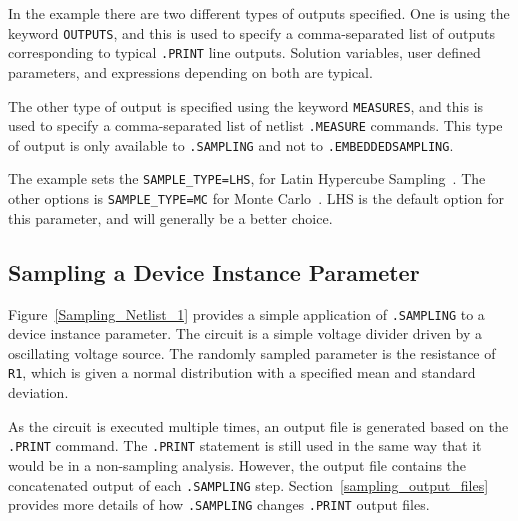 In the example there are two different types of outputs specified.  One is using 
the keyword \texttt{OUTPUTS}, and this is used to specify a comma-separated list 
of outputs corresponding to typical \texttt{.PRINT} line outputs.  Solution 
variables, user defined parameters, and expressions depending on both are typical.  

The other type of output is specified using the keyword \texttt{MEASURES}, and 
this is used to specify a comma-separated list of netlist \texttt{.MEASURE} commands.
This type of output is only available to \texttt{.SAMPLING} and not to \texttt{.EMBEDDEDSAMPLING}.

The example sets the \texttt{SAMPLE\_TYPE=LHS}, for Latin Hypercube Sampling~\cite{HELTON200323}.  
The other options is \texttt{SAMPLE\_TYPE=MC} for Monte Carlo~\cite{Fishman1996}.  
LHS is the default option for this parameter, and will generally be a better choice.

\subsection{Sampling a Device Instance Parameter}
\label{sampling_InstanceParam}
Figure~\ref{Sampling_Netlist_1} provides a simple application of \verb|.SAMPLING| 
to a device instance parameter.  The circuit is a simple voltage divider driven 
by a oscillating voltage source.  The randomly sampled parameter is the resistance 
of \texttt{R1}, which is given a normal distribution with a specified mean and 
standard deviation.

As the circuit is executed multiple times, an output file is generated based on 
the \verb|.PRINT| command.  The \verb|.PRINT| statement is still used in the same 
way that it would be in a non-sampling analysis.  However, the output file 
contains the concatenated output of each \verb|.SAMPLING| step.  
Section~\ref{sampling_output_files} provides more details of how \texttt{.SAMPLING} 
changes \texttt{.PRINT} output files.

